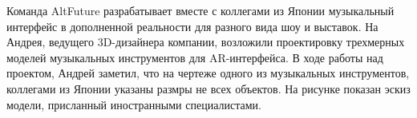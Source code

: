 
Команда AltFuture разрабатывает вместе с коллегами из Японии музыкальный интерфейс в дополненной реальности для разного вида шоу и выставок. На Андрея, ведущего 3D-дизайнера компании, возложили проектировку трехмерных моделей музыкальных инструментов для AR-интерфейса. В ходе работы над проектом, Андрей заметил, что на чертеже одного из музыкальных инструментов,  коллегами из Японии указаны размры не всех объектов. На рисунке показан эскиз модели, присланный иностранными специалистами.

\begin{figure}[h]
    \begin{minipage}[h]{0.49\linewidth}
    \end{minipage}
    \hfill
    \begin{minipage}[h]{0.49\linewidth}

\end{minipage}
\end{figure}
